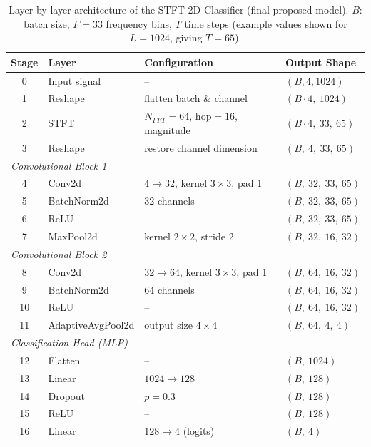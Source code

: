 \documentclass[12pt]{article}
\begin{document}
\begin{table}[H]
\centering
\caption{Layer-by-layer architecture of the STFT-2D Classifier (final proposed model). $B$: batch size, $F=33$ frequency bins, $T$ time steps (example values shown for $L=1024$, giving $T=65$).}
\label{tab:stft2d}
\begin{tabular}{@{}clll@{}}
\toprule
\textbf{Stage} & \textbf{Layer} & \textbf{Configuration} & \textbf{Output Shape} \\
\midrule
0 & Input signal & -- & $(B, 4, 1024)$ \\
1 & Reshape & flatten batch \& channel & $(B{\cdot}4,\ 1024)$ \\
2 & STFT & $N_{FFT}{=}64$, hop${=}16$, magnitude & $(B{\cdot}4,\ 33,\ 65)$ \\
3 & Reshape & restore channel dimension & $(B,\ 4,\ 33,\ 65)$ \\
\midrule
\multicolumn{4}{l}{\textit{Convolutional Block 1}} \\
4 & Conv2d & $4{\to}32$, kernel $3{\times}3$, pad 1 & $(B,\ 32,\ 33,\ 65)$ \\
5 & BatchNorm2d & 32 channels & $(B,\ 32,\ 33,\ 65)$ \\
6 & ReLU & -- & $(B,\ 32,\ 33,\ 65)$ \\
7 & MaxPool2d & kernel $2{\times}2$, stride 2 & $(B,\ 32,\ 16,\ 32)$ \\
\midrule
\multicolumn{4}{l}{\textit{Convolutional Block 2}} \\
8 & Conv2d & $32{\to}64$, kernel $3{\times}3$, pad 1 & $(B,\ 64,\ 16,\ 32)$ \\
9 & BatchNorm2d & 64 channels & $(B,\ 64,\ 16,\ 32)$ \\
10 & ReLU & -- & $(B,\ 64,\ 16,\ 32)$ \\
11 & AdaptiveAvgPool2d & output size $4{\times}4$ & $(B,\ 64,\ 4,\ 4)$ \\
\midrule
\multicolumn{4}{l}{\textit{Classification Head (MLP)}} \\
12 & Flatten & -- & $(B,\ 1024)$ \\
13 & Linear & $1024{\to}128$ & $(B,\ 128)$ \\
14 & Dropout & $p{=}0.3$ & $(B,\ 128)$ \\
15 & ReLU & -- & $(B,\ 128)$ \\
16 & Linear & $128{\to}4$ (logits) & $(B,\ 4)$ \\
\bottomrule
\end{tabular}
\end{table}
\end{document}
